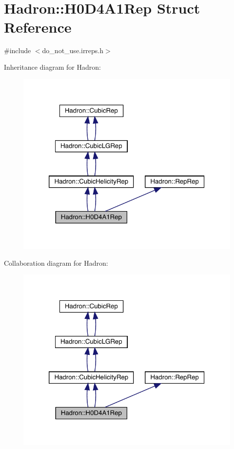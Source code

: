 \hypertarget{structHadron_1_1H0D4A1Rep}{}\section{Hadron\+:\+:H0\+D4\+A1\+Rep Struct Reference}
\label{structHadron_1_1H0D4A1Rep}


{\ttfamily \#include $<$do\+\_\+not\+\_\+use.\+irreps.\+h$>$}



Inheritance diagram for Hadron\+:\nopagebreak
\begin{figure}[H]
\begin{center}
\leavevmode
\includegraphics[width=320pt]{da/db6/structHadron_1_1H0D4A1Rep__inherit__graph}
\end{center}
\end{figure}


Collaboration diagram for Hadron\+:\nopagebreak
\begin{figure}[H]
\begin{center}
\leavevmode
\includegraphics[width=320pt]{dd/da1/structHadron_1_1H0D4A1Rep__coll__graph}
\end{center}
\end{figure}
